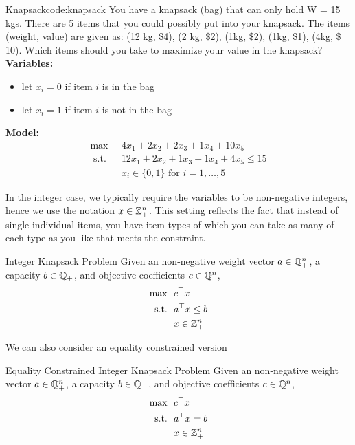 \documentclass[../open-optimization/open-optimization.tex]{subfiles}
\begin{document}
\begin{examplewithcode}{Knapsack}{code:knapsack}
\label{example:knapsack}
You have a knapsack (bag) that can only hold W = 15 kgs.  There are 5 items that you could possibly put into your knapsack.  The items (weight, value) are given as:
(12 kg, $\$$4), (2 kg, $\$$2), (1kg, $\$$2), (1kg, $\$$1), (4kg, $\$$10).  Which items should you take to maximize your value in the knapsack?\\

\noindent \textbf{Variables:}
\begin{itemize}
\item let $x_i = 0$ if item $i$ is in the bag
\item let $x_i = 1$ if item $i$ is not in the bag
\end{itemize}
\textbf{Model:}
\begin{equation}
\begin{split}
\max  \  \ &4 x_1 + 2 x_2 + 2 x_3 + 1 x_4 + 10 x_5\\
\text{ s.t. }\ \ &  12 x_1 + 2 x_2 + 1 x_3 + 1 x_4 + 4 x_5 \leq 15\\
& x_i \in \{0,1\} \text{ for } i=1, \dots, 5
\end{split}
\end{equation}
\end{examplewithcode}
In the integer case, we typically require the variables to be non-negative integers, hence we use the notation $x \in {\mathbb{Z}}^n_+$.  This setting reflects the fact that instead of single individual items, you have item types of which you can take as many of each type as you like that meets the constraint.
\begin{general}{Integer Knapsack Problem}{\npcomplete}
Given an non-negative weight vector $a \in {\mathbb{Q}}^n_+$, a capacity $b \in {\mathbb{Q}}_+$, and objective coefficients $c \in {\mathbb{Q}}^n$, 
\begin{equation}
\begin{split}
\max \ \ & c^\top x\\
\text{s.t.}\ \ & a^\top x \leq b\\
& x \in {\mathbb{Z}}^n_+
\end{split}
\end{equation}
\end{general}
We can also consider an equality constrained version
\begin{general}{Equality Constrained Integer Knapsack Problem}{\nphard}
Given an non-negative weight vector $a \in {\mathbb{Q}}^n_+$, a capacity $b \in {\mathbb{Q}}_+$, and objective coefficients $c \in {\mathbb{Q}}^n$, 
\begin{align}
\max \ \ & c^\top x\\
\text{s.t.}\ \ & a^\top x = b\\
& x \in {\mathbb{Z}}^n_+
\end{align}
\end{general}
\end{document}

